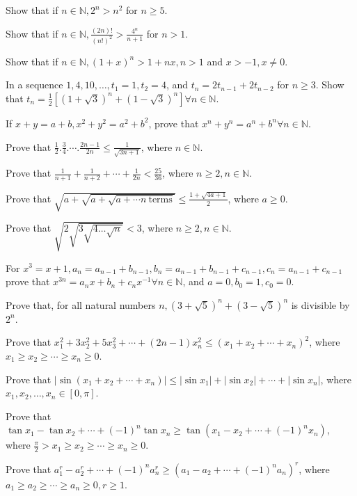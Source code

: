 \item Show that if $n\in\mathbb{N}, 2^n > n^2$ for $n\geq 5$.
\item Show that if $n\in\mathbb{N}, \frac{(2n)!}{(n!)^2} > \frac{4^n}{n + 1}$ for $n > 1$.
\item Show that if $n\in\mathbb{N}, (1 + x)^n > 1 + nx, n > 1$ and $x > -1, x\neq 0$.
\item In a sequence $1, 4, 10, \ldots, t_1 = 1, t_2 = 4$, and $t_n = 2t_{n - 1 } + 2t_{n - 2}$ for $n\geq
  3$. Show that $t_n = \frac{1}{2}\left[(1 + \sqrt{3})^n + (1 - \sqrt{3})^n\right]\forall n\in\mathbb{N}$.
\item If $x + y = a + b, x^2 + y^2 = a^2 + b^2$, prove that $x^n + y^n = a^n + b^n\forall n\in\mathbb{N}$.
\item Prove that $\frac{1}{2}.\frac{3}{4}.\cdots.\frac{2n - 1}{2n}\leq \frac{1}{\sqrt{3n + 1}}$, where $n\in\mathbb{N}$.
\item Prove that $\frac{1}{n + 1} + \frac{1}{n + 2} + \cdots + \frac{1}{2n} < \frac{25}{36}$, where $n\geq 2, n\in\mathbb{N}$.
\item Prove that $\sqrt{a + \sqrt{a + \sqrt{a + \cdots n~\text{terms}}}}\leq \frac{1 + \sqrt{4a + 1}}{2}$, where $a\geq 0$.
\item Prove that $\sqrt{2\sqrt{3\sqrt{4\ldots\sqrt{n}}}} < 3$, where $n\geq 2, n\in\mathbb{N}$.
\item For $x^3 = x + 1, a_n = a_{n - 1} + b_{n - 1}, b_n = a_{n - 1} + b_{n - 1} + c_{n - 1}, c_n = a_{n -
    1} + c_{n - 1}$ prove that $x^{3n} = a_nx + b_n + c_nx^{-1}\forall n\in\mathbb{N}$, and $a=0, b_0 = 1,
  c_0 = 0$.
\item Prove that, for all natural numbers $n, (3 + \sqrt{5})^n + (3 - \sqrt{5})^n$ is divisible by $2^n$.
\item Prove that $x_1^2 + 3x_2^2 + 5x_3^2 + \cdots + (2n - 1)x_n^2\leq(x_1 + x_2 + \cdots + x_n)^2$, where $x_1\geq x_2\geq \cdots
  \geq x_n\geq 0$.
\item Prove that $|\sin(x_1 + x_2 + \cdots + x_n)|\leq |\sin x_1| + |\sin x_2| + \cdots + |\sin x_n|$, where $x_1, x_2, \ldots, x_n
  \in [0, \pi]$.
\item Prove that $\tan x_1 - \tan x_2 + \cdots + (-1)^n\tan x_n \geq \tan(x_1 - x_2 + \cdots + (-1)^nx_n)$, where $\frac{\pi}{2}>
  x_1\geq x_2\geq \cdots \geq x_n\geq 0$.
\item Prove that $a_1^r - a_2^r + \cdots +(-1)^na_n^r\geq (a_1 - a_2 + \cdots +(-1)^na_n)^r$, where $a_1\geq a_2\geq \cdots \geq
  a_n \geq 0, r\geq 1$.
